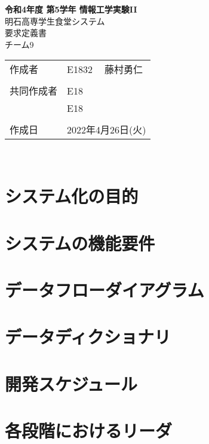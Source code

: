 \documentclass[dvipdfmx, 11pt]{jsarticle}
\begin{document}
\begin{titlepage}
    \centering
    \textbf{令和4年度 第5学年 情報工学実験II}
    \vspace{40pt} \\
    {\LARGE 明石高専学生食堂システム}
    \vspace{10pt} \\
    {\LARGE 要求定義書}
    \vspace{80pt} \\
    チーム9
    \vspace{10pt} \\
    \begin{tabular}{lll}
        作成者      & E1832 & 藤村勇仁 \\
                    &       & \\
        共同作成者  & E18 &  \\
                    & E18 &  \\
                    &       & \\
        作成日      & \multicolumn{2}{l}{2022年4月26日(火)}
    \end{tabular}
    \vspace{\baselineskip} \\
\end{titlepage}

\section{システム化の目的}


\section{システムの機能要件}


\section{データフローダイアグラム}


\section{データディクショナリ}


\section{開発スケジュール}


\section{各段階におけるリーダ}


    



\end{document}
